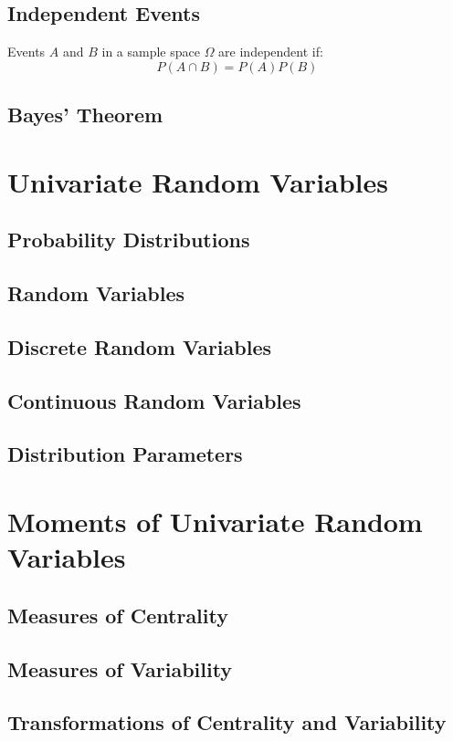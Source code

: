 \documentclass{article}
\begin{document}
\subsection{Independent Events}

Events $A$ and $B$ in a sample space $\Omega$ are independent if:
\[P(A\cap B) = P(A)P(B)\]

\subsection{Bayes' Theorem}

\newpage
\section{Univariate Random Variables}

\subsection{Probability Distributions}
\subsection{Random Variables}
\subsection{Discrete Random Variables}
\subsection{Continuous Random Variables}
\subsection{Distribution Parameters}

\newpage
\section{Moments of Univariate Random Variables}

\subsection{Measures of Centrality}
\subsection{Measures of Variability}
\subsection{Transformations of Centrality and Variability}
\end{document}
